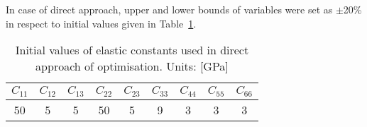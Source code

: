 \documentclass[preprint,12pt]{elsarticle}
\begin{document}
	In case of direct approach, upper and lower bounds of variables were set as  
	\(\pm\)20\% in respect to initial values given in Table~\ref{tab:Ctensor_initial}.
	
	\begin{table}[h!]
		\renewcommand{\arraystretch}{1.3}
		\centering \footnotesize
		\caption{Initial values of elastic constants used in direct approach of optimisation. 
		Units: [GPa]}
		\begin{tabular}{ccccccccc} 
			\toprule
			\(C_{11}\) & \(C_{12}\) & \(C_{13}\)  & \(C_{22}\) & \(C_{23}\) & \(C_{33}\) & 
			\(C_{44}\)  & \(C_{55}\) & \(C_{66}\) \\
			\midrule
			50 &5& 5&  50 & 5 & 9 & 3 & 3 & 3\\
			\bottomrule 
		\end{tabular} 
		\label{tab:Ctensor_initial}
	\end{table}
\end{document}
